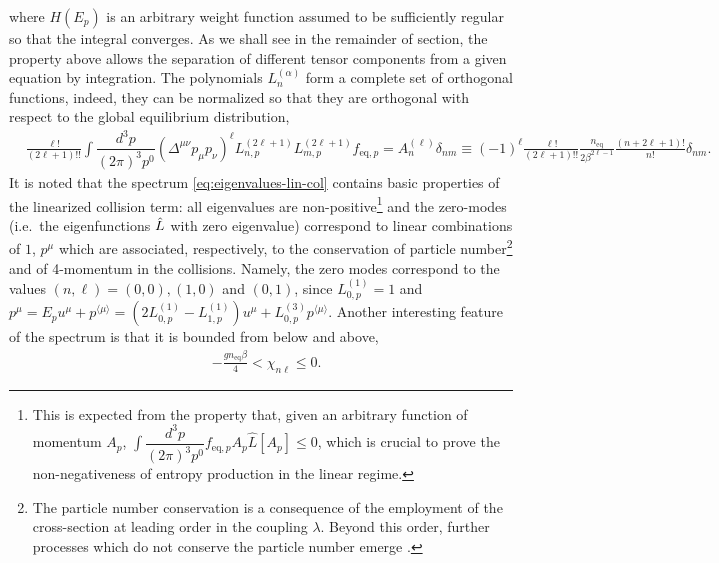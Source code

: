 \documentclass[aps,prd,preprint,nofootinbib,amsmath,amssymb,showpacs,longbibliography,singlecolumn,superscriptaddress,10pt]{revtex4-1}
\theoremstyle{plain}
\theoremstyle{definition}
\begin{document}
%   
where $H(E_{p})$ is an arbitrary weight function assumed to be sufficiently regular so that the integral converges. As we shall see in the remainder of section, the property above allows the separation of different tensor components from a given equation by integration. The polynomials $L_{n}^{(\alpha)}$ form a complete set of orthogonal functions, indeed, they can be normalized so that they are orthogonal with respect to the global equilibrium distribution,
%
\begin{equation}
\label{eq:orth-laguerre}
\begin{aligned}
&
\frac{\ell!}{(2 \ell + 1)!!} \int \dfrac{d^3 p}{(2\pi)^3 p^0} \left( \Delta^{\mu \nu} p_{\mu} p_{\nu} \right)^{\ell} L_{n,p}^{(2 \ell + 1)} L_{m,p}^{(2 \ell + 1)} f_{\mathrm{eq}, p}
=
A^{(\ell)}_{n} \delta_{nm} 
\equiv
(-1)^{\ell} \frac{\ell !}{(2 \ell + 1)!!}\frac{n_{\mathrm{eq}}}{2 \beta^{2 \ell -1}}
\frac{(n+2\ell+1)!}{n!}
\delta_{nm}.
\end{aligned}    
\end{equation}
% 
It is noted that the spectrum \eqref{eq:eigenvalues-lin-col} contains basic properties of the linearized collision term: all eigenvalues are non-positive\footnote{This is expected from the property that, given an arbitrary function of momentum $A_{p}$, $\int \dfrac{d^3 p}{(2\pi)^3 p^0} f_{\mathrm{eq},p} A_{p} \hat{L}[A_{p}]\leq 0$, which is crucial to prove the non-negativeness of entropy production in the linear regime.} and the zero-modes (i.e.~the eigenfunctions $\Hat{L}$ with zero eigenvalue) correspond to linear combinations of $1$, $p^{\mu}$ which are associated, respectively, to the conservation of particle number\footnote{The particle number conservation is a consequence of the employment of the cross-section at leading order in the coupling $\lambda$. Beyond this order, further processes which do not conserve the particle number emerge \cite{Denicol:2022bsq}.} and of 4-momentum in the collisions. Namely, the zero modes correspond to the values $(n, \ell) = (0, 0), (1, 0)$ and $(0, 1)$, since $L_{0,p}^{(1)} = 1$  and $p^{\mu} = E_p u^{\mu} + p^{\langle \mu \rangle} = (2 L^{(1)}_{0,p} - L^{(1)}_{1,p}) u^{\mu} + L^{(3)}_{0,p} p^{\langle \mu \rangle}$. Another interesting feature of the spectrum is that it is bounded from below and above,
%
\begin{equation}
\label{eq:bounded-spectrum}
\begin{aligned}
&
- \frac{g n_{\mathrm{eq}} \beta}{4} < \chi_{n \ell} \leq 0.
\end{aligned}   
\end{equation}
%
\end{document}
